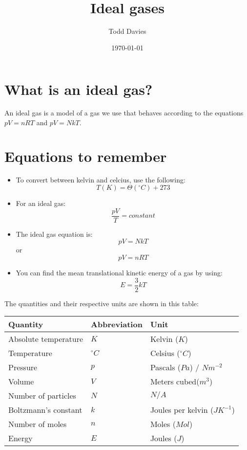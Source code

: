 \documentclass{article}
\title{Ideal gases}
\author{Todd Davies}
\date{\today}
\begin{document}
\lhead{\today}

\maketitle

\section*{What is an ideal gas?}
\thispagestyle{empty}
An ideal gas is a model of a gas we use that behaves according to the equations
$pV = nRT$ and $pV = NkT$.

\section*{Equations to remember}
\begin{itemize}
	\item To convert between kelvin and celcius, use the following:
	\[
		T(K) = \Theta(^\circ C) + 273
	\]
	\item For an ideal gas:
	\[
		\frac{pV}{T} = constant
	\]
	\item The ideal gas equation is:
	\[
		pV = NkT
	\]
	or
	\[
		pV = nRT
	\]
	\item You can find the mean translational kinetic energy of a gas by using:
	\[
		E = \frac{3}{2}kT
	\]
	\end{itemize}

The quantities and their respective units are shown in this table:

\begin{center}
	\begin{tabular}{|l|l|l|}
		\hline
			Quantity & Abbreviation & Unit \\ \hline
			Absolute temperature & $K$ & Kelvin ($K$) \\ \hline
			Temperature & $^\circ C$ & Celsius ($^\circ C$) \\ \hline
			Pressure & $p$ & Pascals ($Pa$) / $Nm^{-2}$ \\ \hline
			Volume & $V$ & Meters cubed($m^3$)\\ \hline
			Number of particles & $N$ & $N/A$\\ \hline
			Boltzmann's constant & $k$ & Joules per kelvin ($JK^{-1}$)\\ \hline
			Number of moles & $n$ & Moles ($Mol$)\\ \hline
			Energy & $E$ & Joules ($J$)\\ \hline
	\end{tabular}
\end{center}
\end{document}
